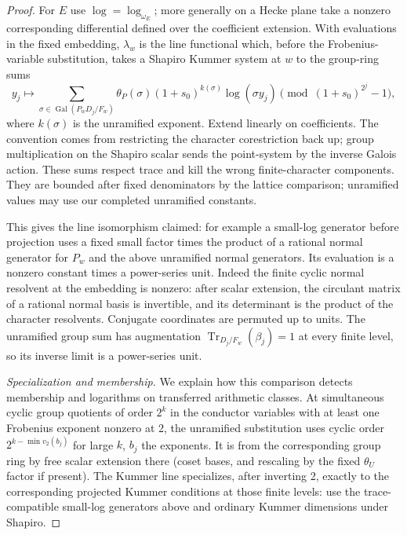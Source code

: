 \begin{proof}
For \(E\) use \(\log=\log_{\omega_E}\); more generally on a Hecke plane take a nonzero corresponding differential defined over the coefficient extension. With evaluations in the fixed embedding, \(\lambda_w\) is the line functional which, before the Frobenius-variable substitution, takes a Shapiro Kummer system at \(w\) to the group-ring sums
\[
 y_j\longmapsto
 \sum_{\sigma\in\operatorname{Gal}(P_wD_j/F_w)}
       \theta_P(\sigma)(1+s_0)^{k(\sigma)}\log(\sigma y_j)
                              \pmod{(1+s_0)^{2^j}-1},
\]
where \(k(\sigma)\) is the unramified exponent. Extend linearly on coefficients. The convention comes from restricting the character corestriction back up; group multiplication on the Shapiro scalar sends the point-system by the inverse Galois action. These sums respect trace and kill the wrong finite-character components. They are bounded after fixed denominators by the lattice comparison; unramified values may use our completed unramified constants.

This gives the line isomorphism claimed: for example a small-log generator before projection uses a fixed small factor times the product of a rational normal generator for \(P_w\) and the above unramified normal generators. Its evaluation is a nonzero constant times a power-series unit. Indeed the finite cyclic normal resolvent at the embedding is nonzero: after scalar extension, the circulant matrix of a rational normal basis is invertible, and its determinant is the product of the character resolvents. Conjugate coordinates are permuted up to units. The unramified group sum has augmentation \(\operatorname{Tr}_{D_j/F_w}(\beta_j)=1\) at every finite level, so its inverse limit is a power-series unit.

\smallskip\noindent\emph{Specialization and membership.}
We explain how this comparison detects membership and logarithms on transferred arithmetic classes. At simultaneous cyclic group quotients of order \(2^k\) in the conductor variables with at least one Frobenius exponent nonzero at 2, the unramified substitution uses cyclic order \(2^{k-\min v_2(b_j)}\) for large \(k\), \(b_j\) the exponents. It is from the corresponding group ring by free scalar extension there (coset bases, and rescaling by the fixed \(\theta_U\) factor if present). The Kummer line specializes, after inverting 2, exactly to the corresponding projected Kummer conditions at those finite levels: use the trace-compatible small-log generators above and ordinary Kummer dimensions under Shapiro.


\end{proof}
